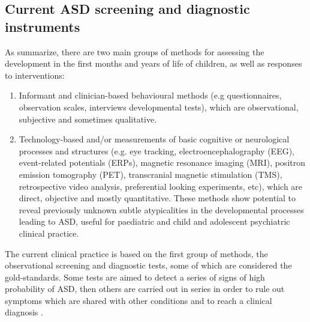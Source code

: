 \subsection{Current ASD screening and diagnostic instruments}
\label{sec:screeningdiagnostics}

\newline


As \citep{bolte2016detection} summarize, there are two main groups of methods for assessing the development in the first months and years of life of children, as well as responses to interventions:
\begin{enumerate}
    \item Informant and clinician-based behavioural methods (e.g questionnaires, observation scales, interviews developmental tests), which are observational, subjective and sometimes qualitative.
    \item Technology-based and/or measurements of basic cognitive or neurological processes and structures (e.g. eye tracking, electroencephalography (EEG), event-related potentials (ERPs), magnetic resonance imaging (MRI), positron emission tomography (PET), transcranial magnetic stimulation (TMS), retrospective video analysis, preferential looking experiments, etc), which are direct, objective and mostly quantitative. These methods show potential to reveal previously unknown subtle atypicalities in the developmental processes leading to ASD, useful for paediatric and child and adolescent psychiatric clinical practice.
\end{enumerate}
The current clinical practice is based on the first group of methods, the observational screening and diagnostic tests, some of which are considered the gold-standards. Some tests are aimed to detect a series of signs of high probability of ASD, then others are carried out in series in order to rule out symptoms which are shared with other conditions and to reach a clinical diagnosis \citep{vargas2016diagnosis}.

